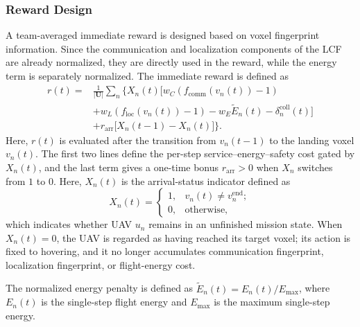 \documentclass[10pt,journal,letterpaper]{IEEEtran}
\begin{document}
\subsubsection{Reward Design}
A team-averaged immediate reward is designed based on voxel fingerprint information. Since the communication and localization components of the LCF are already normalized, they are directly used in the reward, while the energy term is separately normalized. The immediate reward is defined as
\begin{equation}
\begin{aligned}
r(t)=&\frac{1}{|\mathbf{U}|}\sum_{n}\Big\{X_n(t)\Big[
 w_C(f_{\mathrm{comm}}(v_n(t))-1)\\
&+w_L(f_{\mathrm{loc}}(v_n(t))-1)-w_E\widetilde{E}_n(t)-\delta_n^{\mathrm{coll}}(t)\Big]\\
&+r_{\mathrm{arr}}\big[X_n(t-1)-X_n(t)\big]\Big\}.
\end{aligned}
\end{equation}
Here, $r(t)$ is evaluated after the transition from $v_n(t-1)$ to the landing voxel $v_n(t)$. The first two lines define the per-step service--energy--safety cost gated by $X_n(t)$, and the last term gives a one-time bonus $r_{\mathrm{arr}}>0$ when $X_n$ switches from $1$ to $0$.
Here, $X_n(t)$ is the arrival-status indicator defined as
\begin{equation}
X_n(t)=
\begin{cases}
1, & v_n(t)\neq v_n^{\mathrm{end}};\\
0, & \mathrm{otherwise},
\end{cases}
\end{equation}
which indicates whether UAV $u_n$ remains in an unfinished mission state. When $X_n(t)=0$, the UAV is regarded as having reached its target voxel; its action is fixed to hovering, and it no longer accumulates communication fingerprint, localization fingerprint, or flight-energy cost.

The normalized energy penalty is defined as 
$\tilde{E}_n(t)=E_n(t)/E_{\max}$, where $E_n(t)$ is the single-step flight energy and 
$E_{\max}$ is the maximum single-step energy.
\end{document}
